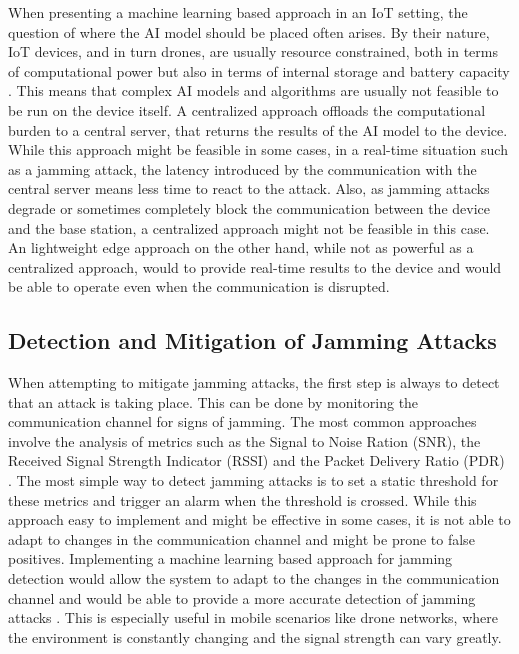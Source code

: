 \documentclass[futureinternet,article,submit,pdftex,moreauthors]{Definitions/mdpi}
\begin{document}
When presenting a machine learning based approach in an IoT setting, the question of where the AI model should be placed often arises. By their nature, IoT devices, and in turn drones, are usually resource constrained, 
both in terms of computational power but also in terms of internal storage and battery capacity \cite{6GSecurity-Chorti}. This means that complex AI models and algorithms are usually not feasible to be run on the device itself. A centralized approach 
offloads the computational burden to a central server, that returns the results of the AI model to the device. While this approach might be feasible in some cases, in a real-time situation such as a jamming attack, the latency introduced by the
communication with the central server means less time to react to the attack. Also, as jamming attacks degrade or sometimes completely block the communication between the device and the base station, a centralized approach might not be feasible in this case.
An lightweight edge approach on the other hand, while not as powerful as a centralized approach, would to provide real-time results to the device and would be able to operate even when the communication is disrupted. 

\subsection{Detection and Mitigation of Jamming Attacks}

When attempting to mitigate jamming attacks, the first step is always to detect that an attack is taking place. This can be done by monitoring the communication channel for signs of jamming. 
The most common approaches involve the analysis of metrics such as the Signal to Noise Ration (SNR), the Received Signal Strength Indicator (RSSI) and the Packet Delivery Ratio (PDR) \cite{JammingDetection-Sciancalepore}. The most simple way 
to detect jamming attacks is to set a static threshold for these metrics and trigger an alarm when the threshold is crossed. While this approach easy to implement and might be effective in some cases, it is not able to adapt to changes in the communication channel and might be prone to false positives.
Implementing a machine learning based approach for jamming detection would allow the system to adapt to the changes in the communication channel and would be able to provide a more accurate detection of jamming attacks \cite{VANETsAI-Lyamin}. This is especially useful in mobile scenarios like 
drone networks, where the environment is constantly changing and the signal strength can vary greatly.
\end{document}
